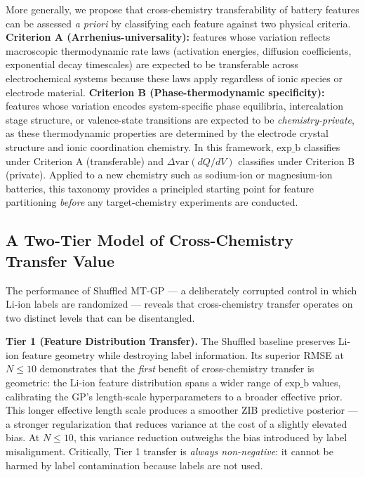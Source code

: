 \documentclass[12pt]{article}
\begin{document}
More generally, we propose that cross-chemistry transferability of battery
features can be assessed \emph{a priori} by classifying each feature against
two physical criteria.
\textbf{Criterion A (Arrhenius-universality):} features whose variation reflects
macroscopic thermodynamic rate laws (activation energies, diffusion coefficients,
exponential decay timescales) are expected to be transferable across
electrochemical systems because these laws apply regardless of ionic species or
electrode material.
\textbf{Criterion B (Phase-thermodynamic specificity):} features whose variation
encodes system-specific phase equilibria, intercalation stage structure, or
valence-state transitions are expected to be \emph{chemistry-private}, as these
thermodynamic properties are determined by the electrode crystal structure and
ionic coordination chemistry.
In this framework, $\text{exp\_b}$ classifies under Criterion A (transferable)
and $\Delta\mathrm{var}(dQ/dV)$ classifies under Criterion B (private).
Applied to a new chemistry such as sodium-ion or magnesium-ion batteries, this
taxonomy provides a principled starting point for feature partitioning
\emph{before} any target-chemistry experiments are conducted.

\subsection{A Two-Tier Model of Cross-Chemistry Transfer Value}

The performance of Shuffled MT-GP --- a deliberately corrupted control in which
Li-ion labels are randomized --- reveals that cross-chemistry transfer operates
on two distinct levels that can be disentangled.

\textbf{Tier 1 (Feature Distribution Transfer).} The Shuffled baseline
preserves Li-ion feature geometry while destroying label information.
Its superior RMSE at $N \leq 10$ demonstrates that the \emph{first} benefit of
cross-chemistry transfer is geometric: the Li-ion feature distribution spans a
wider range of $\text{exp\_b}$ values, calibrating the GP's length-scale
hyperparameters to a broader effective prior. This longer effective length scale
produces a smoother ZIB predictive posterior --- a stronger regularization that
reduces variance at the cost of a slightly elevated bias. At $N \leq 10$,
this variance reduction outweighs the bias introduced by label misalignment.
Critically, Tier 1 transfer is \emph{always non-negative}: it cannot be harmed
by label contamination because labels are not used.
\end{document}
